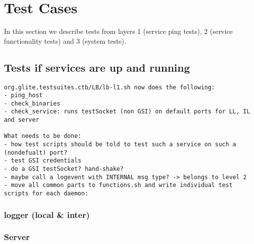 
\section{Test Cases}
\label{s:tests}

In this section we describe tests from layers 1 (service ping tests), 
2 (service functionality tests) and 3 (system tests). 



\subsection{Tests if services are up and running}

\begin{verbatim}
org.glite.testsuites.ctb/LB/lb-l1.sh now does the following:
- ping_host
- check_binaries
- check_service: runs testSocket (non GSI) on default ports for LL, IL and server

What needs to be done:
- how test scripts should be told to test such a service on such a (nondefualt) port?
- test GSI credentials
- do a GSI testSocket? hand-shake? 
- maybe call a logevent with INTERNAL msg type? -> belongs to level 2
- move all common parts to functions.sh and write individual test scripts for each daemon:
\end{verbatim}

\subsubsection{logger (local \& inter)}

\subsubsection{Server}



